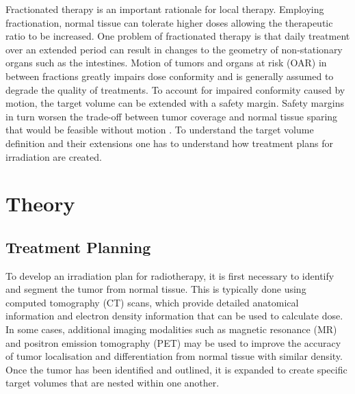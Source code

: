 \documentclass[\relativeRoot/ada.tex]{subfiles}
\begin{document}
Fractionated therapy is an important rationale for local therapy. Employing fractionation, normal tissue can tolerate higher doses allowing the therapeutic ratio to be increased. One problem of fractionated therapy is that daily treatment over an extended period can result in changes to the geometry of non-stationary organs such as the intestines. Motion of tumors and organs at risk (OAR) in between fractions greatly impairs dose conformity and is generally assumed to degrade the quality of treatments. To account for impaired conformity caused by motion, the target volume can be extended with a safety margin. Safety margins in turn worsen the trade-off between tumor coverage and normal tissue sparing that would be feasible without motion \cite{van_herk_correctdose}. To understand the target volume definition and their extensions one has to understand how treatment plans for irradiation are created.



\section{Theory}

\subsection{Treatment Planning}

To develop an irradiation plan for radiotherapy, it is first necessary to identify and segment the tumor from normal tissue. This is typically done using computed tomography (CT) scans, which provide detailed anatomical information and electron density information that can be used to calculate dose. In some cases, additional imaging modalities such as magnetic resonance (MR) and positron emission tomography (PET) may be used to improve the accuracy of tumor localisation and differentiation from normal tissue with similar density. Once the tumor has been identified and outlined, it is expanded to create specific target volumes that are nested within one another. \cite{barrett_practical}
\end{document}

